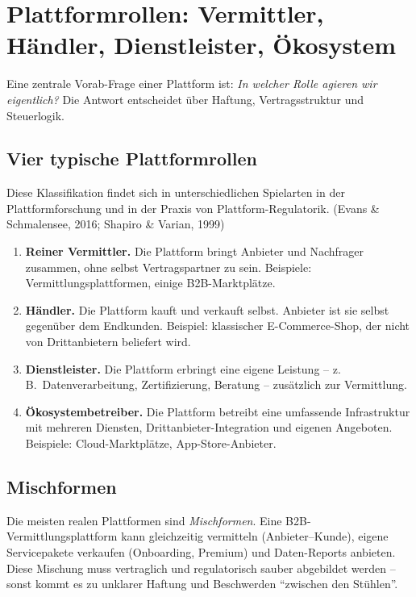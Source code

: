 \documentclass[11pt,a4paper,oneside]{article}
\newcommand{\fachbegriff}[1]{\textbf{#1}}
\newcommand{\quelle}[1]{{\footnotesize\color{lpGray}(#1)}}
\begin{document}
\section{Plattformrollen: Vermittler, Händler, Dienstleister, Ökosystem}

Eine zentrale Vorab-Frage einer Plattform ist: \emph{In welcher Rolle agieren wir eigentlich?} Die Antwort entscheidet über Haftung, Vertragsstruktur und Steuerlogik.

\subsection{Vier typische Plattformrollen}

Diese Klassifikation findet sich in unterschiedlichen Spielarten in der Plattformforschung und in der Praxis von Plattform-Regulatorik. \quelle{Evans \& Schmalensee, 2016; Shapiro \& Varian, 1999}

\begin{enumerate}
  \item \fachbegriff{Reiner Vermittler.} Die Plattform bringt Anbieter und Nachfrager zusammen, ohne selbst Vertragspartner zu sein. Beispiele: Vermittlungsplattformen, einige B2B-Marktplätze.
  \item \fachbegriff{Händler.} Die Plattform kauft und verkauft selbst. Anbieter ist sie selbst gegenüber dem Endkunden. Beispiel: klassischer E-Commerce-Shop, der nicht von Drittanbietern beliefert wird.
  \item \fachbegriff{Dienstleister.} Die Plattform erbringt eine eigene Leistung -- z.\,B.\ Datenverarbeitung, Zertifizierung, Beratung -- zusätzlich zur Vermittlung.
  \item \fachbegriff{Ökosystembetreiber.} Die Plattform betreibt eine umfassende Infrastruktur mit mehreren Diensten, Drittanbieter-Integration und eigenen Angeboten. Beispiele: Cloud-Marktplätze, App-Store-Anbieter.
\end{enumerate}

\subsection{Mischformen}

Die meisten realen Plattformen sind \emph{Mischformen}. Eine B2B-Vermittlungsplattform kann gleichzeitig vermitteln (Anbieter--Kunde), eigene Servicepakete verkaufen (Onboarding, Premium) und Daten-Reports anbieten. Diese Mischung muss vertraglich und regulatorisch sauber abgebildet werden -- sonst kommt es zu unklarer Haftung und Beschwerden ``zwischen den Stühlen''.
\end{document}
